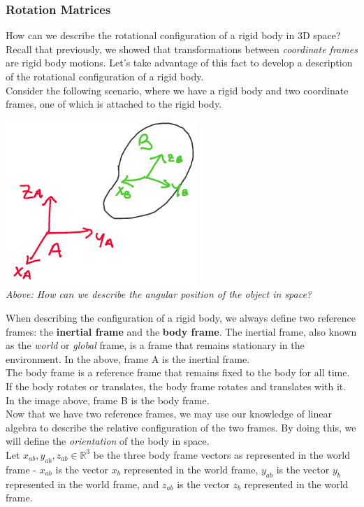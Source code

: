 \documentclass[oneside]{book}
\begin{document}
\subsubsection{Rotation Matrices}
How can we describe the rotational configuration of a rigid body in 3D space? Recall that previously, we showed that transformations between \textit{coordinate frames} are rigid body motions. Let's take advantage of this fact to develop a description of the rotational configuration of a rigid body.\\
Consider the following scenario, where we have a rigid body and two coordinate frames, one of which is attached to the rigid body.
\begin{center}
    \includegraphics[scale=0.5]{images/rotationmatrix.png}\\
    \textit{Above: How can we describe the angular position of the object in space?}
\end{center}
When describing the configuration of a rigid body, we always define two reference frames: the \textbf{inertial frame} and the \textbf{body frame}. The inertial frame, also known as the \textit{world} or \textit{global} frame, is a frame that remains stationary in the environment. In the above, frame A is the inertial frame.\\
The body frame is a reference frame that remains fixed to the body for all time. If the body rotates or translates, the body frame rotates and translates with it. In the image above, frame B is the body frame.\\
Now that we have two reference frames, we may use our knowledge of linear algebra to describe the relative configuration of the two frames. By doing this, we will define the \textit{orientation} of the body in space.\\
Let $x_{ab}, y_{ab}, z_{ab} \in \mathbb{R}^3$ be the three body frame vectors as represented in the world frame - $x_{ab}$ is the vector $x_b$ represented in the world frame, $y_{ab}$ is the vector $y_b$ represented in the world frame, and $z_{ab}$ is the vector $z_b$ represented in the world frame.\\
\end{document}
